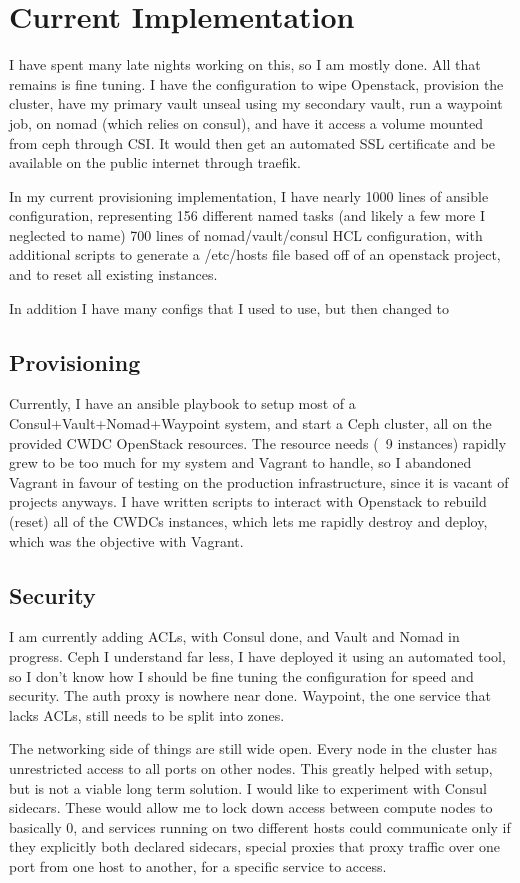\documentclass{article}
\begin{document}
\section{Current Implementation}
I have spent many late nights working on this, so I am mostly done. All that remains is fine tuning. I have the configuration to wipe Openstack, provision the cluster, have my primary vault unseal using my secondary vault, run a waypoint job, on nomad (which relies on consul), and have it access a volume mounted from ceph through CSI. It would then get an automated SSL certificate and be available on the public internet through traefik.

In my current provisioning implementation, I have nearly 1000 lines of ansible configuration, representing 156 different named tasks (and likely a few more I neglected to name) 700 lines of nomad/vault/consul HCL configuration, with additional scripts to generate a /etc/hosts file based off of an openstack project, and to reset all existing instances.

In addition I have many configs that I used to use, but then changed to 

\subsection{Provisioning}
Currently, I have an ansible playbook to setup most of a Consul+Vault+Nomad+Waypoint system, and start a Ceph cluster, all on the provided CWDC OpenStack resources. The resource needs (~9 instances) rapidly grew to be too much for my system and Vagrant to handle, so I abandoned Vagrant in favour of testing on the production infrastructure, since it is vacant of projects anyways. I have written scripts to interact with Openstack to rebuild (reset) all of the CWDCs instances, which lets me rapidly destroy and deploy, which was the objective with Vagrant.

\subsection{Security}
I am currently adding ACLs, with Consul done, and Vault and Nomad in progress. Ceph I understand far less, I have deployed it using an automated tool, so I don't know how I should be fine tuning the configuration for speed and security. The auth proxy is nowhere near done. Waypoint, the one service that lacks ACLs, still needs to be split into zones. 


The networking side of things are still wide open. Every node in the cluster has unrestricted access to all ports on other nodes. This greatly helped with setup, but is not a viable long term solution. I would like to experiment with Consul sidecars. These would allow me to lock down access between compute nodes to basically 0, and services running on two different hosts could communicate only if they explicitly both declared sidecars, special proxies that proxy traffic over one port from one host to another, for a specific service to access.
\end{document}
